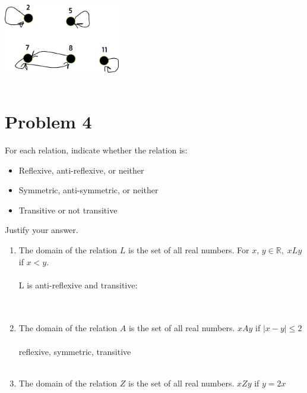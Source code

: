 \documentclass{amsart}
\theoremstyle{definition}
\theoremstyle{Exercise}
\theoremstyle{remark}
\theoremstyle{rule}
\numberwithin{equation}{section}
\newcommand{\Real}{\mathbb R}
\begin{document}
\begin{enumerate}[label=(\alph*)]
\includegraphics[width=2in]{3333.png}
\\\\
\end{enumerate}
 \newpage

\section*{Problem 4}

For each relation, indicate whether the relation is:
\begin{itemize}
  \item Reflexive, anti-reflexive, or neither
  \item Symmetric, anti-symmetric, or neither
  \item Transitive or not transitive
\end{itemize}
Justify your answer.\\
\begin{enumerate}[label=(\alph*)]
\item The domain of the relation $L$ is the set of all real numbers. For $x$, $y \in \Real, \; xLy$ if $x < y$.\\\\
L is anti-reflexive and transitive:\\

\\\\

\item The domain of the relation $A$ is the set of all real numbers. $xAy$ if $|x-y| \leq 2$\\\\
reflexive, symmetric, transitive
\\\\
\item The domain of the relation $Z$ is the set of all real numbers. $xZy$ if $y=2x$\\\\\\\\
\\\\
\end{enumerate}
\newpage
\end{document}
